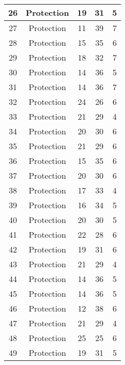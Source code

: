 \documentclass[results.tex]{subfiles}
\begin{document}
\begin{center}
\begin{tabular}{| c || c | c | c | c |}
    \hline
    26 & Protection & 19 & 31 & 5 \\ 
    \hline
    27 & Protection & 11 & 39 & 7 \\ 
    \hline
    28 & Protection & 15 & 35 & 6 \\ 
    \hline
    29 & Protection & 18 & 32 & 7 \\ 
    \hline
    30 & Protection & 14 & 36 & 5 \\ 
    \hline
    31 & Protection & 14 & 36 & 7 \\ 
    \hline
    32 & Protection & 24 & 26 & 6 \\ 
    \hline
    33 & Protection & 21 & 29 & 4 \\ 
    \hline
    34 & Protection & 20 & 30 & 6 \\ 
    \hline
    35 & Protection & 21 & 29 & 6 \\ 
    \hline
    36 & Protection & 15 & 35 & 6 \\ 
    \hline
    37 & Protection & 20 & 30 & 6 \\ 
    \hline
    38 & Protection & 17 & 33 & 4 \\ 
    \hline
    39 & Protection & 16 & 34 & 5 \\ 
    \hline
    40 & Protection & 20 & 30 & 5 \\ 
    \hline
    41 & Protection & 22 & 28 & 6 \\ 
    \hline
    42 & Protection & 19 & 31 & 6 \\ 
    \hline
    43 & Protection & 21 & 29 & 4 \\ 
    \hline
    44 & Protection & 14 & 36 & 5 \\ 
    \hline
    45 & Protection & 14 & 36 & 5 \\ 
    \hline
    46 & Protection & 12 & 38 & 6 \\ 
    \hline
    47 & Protection & 21 & 29 & 4 \\ 
    \hline
    48 & Protection & 25 & 25 & 6 \\ 
    \hline
    49 & Protection & 19 & 31 & 5 \\ 
    \hline   \end{tabular}
\end{center}
\end{document}
